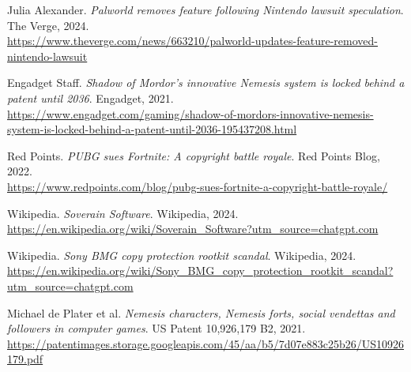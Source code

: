 \documentclass[12pt,letterpaper]{article}
\begin{document}
\pagebreak

\begin{thebibliography}{99}

Julia Alexander. \textit{Palworld removes feature following Nintendo lawsuit speculation}. The Verge, 2024.\\
\url{https://www.theverge.com/news/663210/palworld-updates-feature-removed-nintendo-lawsuit}

Engadget Staff. \textit{Shadow of Mordor’s innovative Nemesis system is locked behind a patent until 2036}. Engadget, 2021.\\
\url{https://www.engadget.com/gaming/shadow-of-mordors-innovative-nemesis-system-is-locked-behind-a-patent-until-2036-195437208.html}

Red Points. \textit{PUBG sues Fortnite: A copyright battle royale}. Red Points Blog, 2022.\\
\url{https://www.redpoints.com/blog/pubg-sues-fortnite-a-copyright-battle-royale/}

Wikipedia. \textit{Soverain Software}. Wikipedia, 2024.\\
\url{https://en.wikipedia.org/wiki/Soverain_Software?utm_source=chatgpt.com}

Wikipedia. \textit{Sony BMG copy protection rootkit scandal}. Wikipedia, 2024.\\
\url{https://en.wikipedia.org/wiki/Sony_BMG_copy_protection_rootkit_scandal?utm_source=chatgpt.com}

Michael de Plater et al. \textit{Nemesis characters, Nemesis forts, social vendettas and followers in computer games}. US Patent 10,926,179 B2, 2021.\\
\url{https://patentimages.storage.googleapis.com/45/aa/b5/7d07e883c25b26/US10926179.pdf}

\end{thebibliography}
\end{document}
